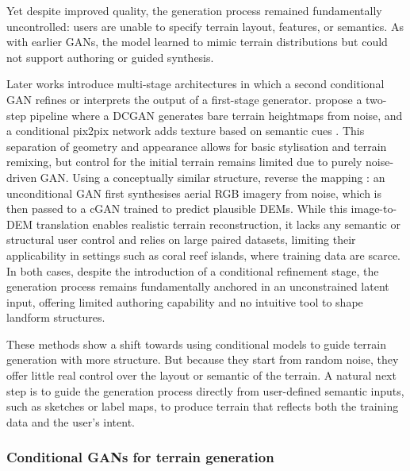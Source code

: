 Yet despite improved quality, the generation process remained fundamentally uncontrolled: users are unable to specify terrain layout, features, or semantics. As with earlier GANs, the model learned to mimic terrain distributions but could not support authoring or guided synthesis.

Later works introduce multi-stage architectures in which a second conditional GAN refines or interprets the output of a first-stage generator.  propose a two-step pipeline where a DCGAN generates bare terrain heightmaps from noise, and a conditional pix2pix network adds texture based on semantic cues \cite{Beckham2017}. This separation of geometry and appearance allows for basic stylisation and terrain remixing, but control for the initial terrain remains limited due to purely noise-driven GAN. Using a conceptually similar structure,  reverse the mapping \cite{Panagiotou2020}: an unconditional GAN first synthesises aerial RGB imagery from noise, which is then passed to a cGAN trained to predict plausible DEMs. While this image-to-DEM translation enables realistic terrain reconstruction, it lacks any semantic or structural user control and relies on large paired datasets, limiting their applicability in settings such as coral reef islands, where training data are scarce. In both cases, despite the introduction of a conditional refinement stage, the generation process remains fundamentally anchored in an unconstrained latent input, offering limited authoring capability and no intuitive tool to shape landform structures.

These methods show a shift towards using conditional models to guide terrain generation with more structure. But because they start from random noise, they offer little real control over the layout or semantic of the terrain. A natural next step is to guide the generation process directly from user-defined semantic inputs, such as sketches or label maps, to produce terrain that reflects both the training data and the user's intent.


\subsubsection{Conditional GANs for terrain generation}
\label{sec:coral-island-sota-cGAN}

